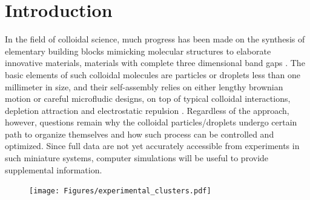 

\section{Introduction}
\label{intro}

In the field of colloidal science, much progress has been made on the synthesis of elementary building blocks  mimicking molecular structures to elaborate innovative materials, \eg materials with complete three dimensional band gaps \cite{Xia_etal_AM2000, Velev_etal_AM2009, Li_etal_AC2011, Sacanna_etal_COCIS2011}. The basic elements of such colloidal molecules are particles or droplets less than one millimeter in size, and their self-assembly relies on either lengthy brownian motion or careful microfludic designs, on top of typical colloidal interactions, \eg depletion attraction and electrostatic repulsion \cite{Mewis_colloidal, Yi_etal_CM2013, Shen_AS_2016}. Regardless of the approach, however, questions remain why the colloidal particles/droplets undergo certain path to organize themselves and how such process can be controlled and optimized. Since full data are not yet accurately accessible from experiments in such miniature systems, computer simulations will be useful to provide supplemental information.

\begin{figure}[t!]
\centering
  \texttt{[image: Figures/experimental\_clusters.pdf]}
  \caption{}
  \label{fig:exp}
\end{figure}

